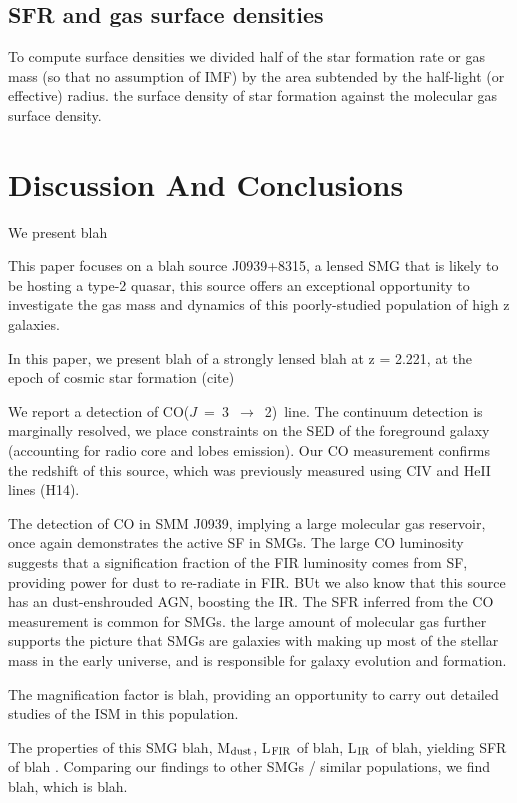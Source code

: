 \documentclass[twocolumn,apj,numberedappendix]{emulateapj}
\newcommand{\CO}{\mbox{CO($J$ = 3 $\rightarrow$ 2) }}
\begin{document}
\subsection{SFR and gas surface densities}
To compute surface densities we divided half of the star formation rate or gas mass (so that no assumption of IMF) by the area subtended by the half-light (or effective) radius.
 the surface density of star formation against the molecular gas surface density. 


\section{Discussion And Conclusions} \label{sec:conclusions}
We present blah

This paper focuses on a blah source J0939+8315, a lensed SMG that is likely to be hosting a type-2 quasar, this source offers an exceptional opportunity to
investigate the gas mass and dynamics of this
poorly-studied population of high z galaxies.

In this paper, we present blah of a strongly lensed blah at z = 2.221, at the epoch of cosmic star formation (cite)

We report a detection of \CO line.
The continuum detection is marginally resolved, we place constraints on the SED of the foreground galaxy (accounting for radio 
core and lobes emission). Our CO measurement confirms the redshift of this source, which was previously measured using CIV and HeII lines (H14).

The detection of CO in SMM J0939, implying a large molecular gas reservoir, once again demonstrates the active SF in SMGs. 
The large CO luminosity suggests that a signification fraction of the FIR luminosity comes from SF, providing power for dust to re-radiate in FIR. BUt we also know that this source has an dust-enshrouded AGN, boosting the IR.
The SFR inferred from the CO measurement is common for SMGs. the large amount of molecular gas further supports the picture that SMGs are galaxies with making up most of the stellar mass in the early universe, and is responsible for galaxy evolution and formation. 

The magnification factor is blah, providing an opportunity to carry out detailed studies of the ISM in this population.

The properties of this SMG blah, M$_{\rm dust}$, L$_{\rm FIR}$ of blah, L$_{\rm IR}$ of blah, yielding SFR of 
blah . Comparing our findings to other SMGs / similar populations, we find blah, which is blah.
\end{document}
